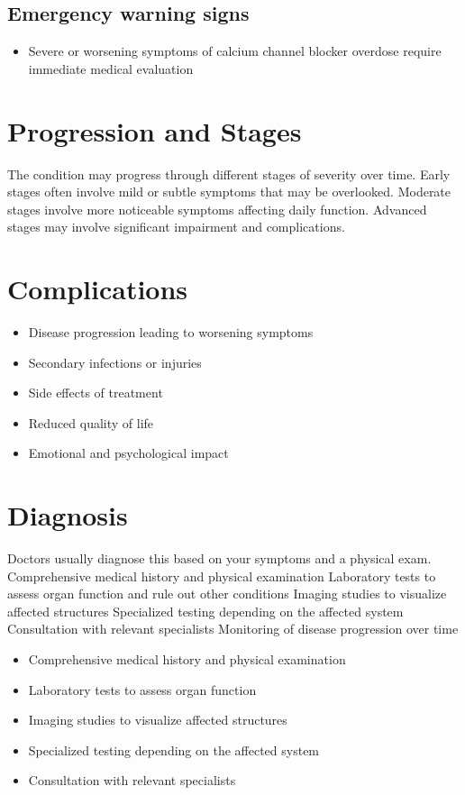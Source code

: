 \subsection{Emergency warning signs}
\begin{itemize}[noitemsep]
  \item Severe or worsening symptoms of calcium channel blocker overdose require immediate medical evaluation
\end{itemize}
\section{Progression and Stages}
The condition may progress through different stages of severity over time. Early stages often involve mild or subtle symptoms that may be overlooked. Moderate stages involve more noticeable symptoms affecting daily function. Advanced stages may involve significant impairment and complications.
\section{Complications}
\begin{itemize}[noitemsep]
  \item Disease progression leading to worsening symptoms
  \item Secondary infections or injuries
  \item Side effects of treatment
  \item Reduced quality of life
  \item Emotional and psychological impact
\end{itemize}
\section{Diagnosis}
Doctors usually diagnose this based on your symptoms and a physical exam. Comprehensive medical history and physical examination Laboratory tests to assess organ function and rule out other conditions Imaging studies to visualize affected structures Specialized testing depending on the affected system Consultation with relevant specialists Monitoring of disease progression over time

\begin{itemize}[noitemsep]
  \item Comprehensive medical history and physical examination
  \item Laboratory tests to assess organ function
  \item Imaging studies to visualize affected structures
  \item Specialized testing depending on the affected system
  \item Consultation with relevant specialists
\end{itemize}
